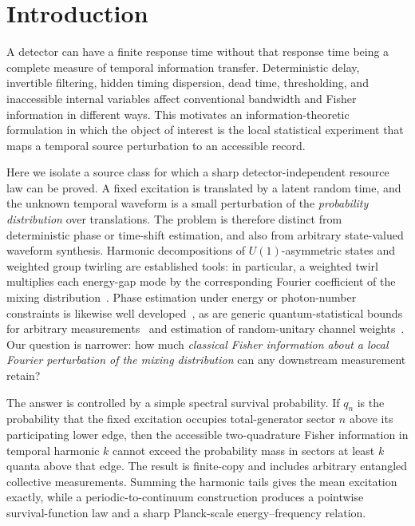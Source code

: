\documentclass[aps,pra,reprint,amsmath,amssymb,longbibliography]{revtex4-2}
\begin{document}
\section{Introduction}

A detector can have a finite response time without that response time being a complete measure of temporal information transfer.  Deterministic delay, invertible filtering, hidden timing dispersion, dead time, thresholding, and inaccessible internal variables affect conventional bandwidth and Fisher information in different ways.  This motivates an information-theoretic formulation in which the object of interest is the local statistical experiment that maps a temporal source perturbation to an accessible record.

Here we isolate a source class for which a sharp detector-independent resource law can be proved.  A fixed excitation is translated by a latent random time, and the unknown temporal waveform is a small perturbation of the \emph{probability distribution} over translations.  The problem is therefore distinct from deterministic phase or time-shift estimation, and also from arbitrary state-valued waveform synthesis.  Harmonic decompositions of $U(1)$-asymmetric states and weighted group twirling are established tools: in particular, a weighted twirl multiplies each energy-gap mode by the corresponding Fourier coefficient of the mixing distribution~\cite{MarvianSpekkens2014Modes}.  Phase estimation under energy or photon-number constraints is likewise well developed~\cite{BuzekDerkaMassar1999,ImaiHayashi2009,Hayashi2011}, as are generic quantum-statistical bounds for arbitrary measurements~\cite{BraunsteinCaves1994,Gill2005} and estimation of random-unitary channel weights~\cite{FujiwaraImai2003}.  Our question is narrower: how much \emph{classical Fisher information about a local Fourier perturbation of the mixing distribution} can any downstream measurement retain?

The answer is controlled by a simple spectral survival probability.  If $q_n$ is the probability that the fixed excitation occupies total-generator sector $n$ above its participating lower edge, then the accessible two-quadrature Fisher information in temporal harmonic $k$ cannot exceed the probability mass in sectors at least $k$ quanta above that edge.  The result is finite-copy and includes arbitrary entangled collective measurements.  Summing the harmonic tails gives the mean excitation exactly, while a periodic-to-continuum construction produces a pointwise survival-function law and a sharp Planck-scale energy--frequency relation.
\end{document}

